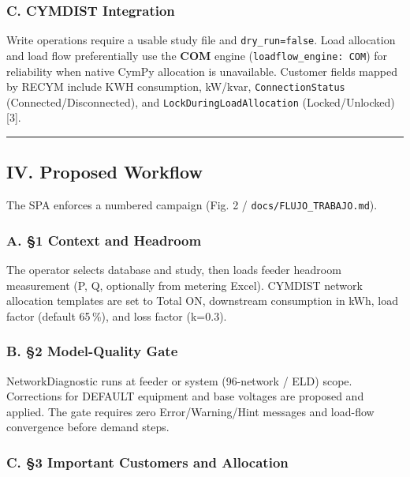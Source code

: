 \documentclass[
  11pt,
]{article}
\begin{document}
\subsubsection{C. CYMDIST Integration}\label{c.-cymdist-integration}

Write operations require a usable study file and
\texttt{dry\_run=false}. Load allocation and load flow preferentially
use the \textbf{COM} engine (\texttt{loadflow\_engine:\ COM}) for
reliability when native CymPy allocation is unavailable. Customer fields
mapped by RECYM include KWH consumption, kW/kvar,
\texttt{ConnectionStatus} (Connected/Disconnected), and
\texttt{LockDuringLoadAllocation} (Locked/Unlocked) {[}3{]}.

\begin{center}\rule{0.5\linewidth}{0.5pt}\end{center}

\subsection{IV. Proposed Workflow}\label{iv.-proposed-workflow}

The SPA enforces a numbered campaign (Fig. 2 /
\texttt{docs/FLUJO\_TRABAJO.md}).

\subsubsection{A. §1 Context and
Headroom}\label{a.-1-context-and-headroom}

The operator selects database and study, then loads feeder headroom
measurement (P, Q, optionally from metering Excel). CYMDIST network
allocation templates are set to Total ON, downstream consumption in kWh,
load factor (default 65\,\%), and loss factor (k=0.3).

\subsubsection{B. §2 Model-Quality Gate}\label{b.-2-model-quality-gate}

NetworkDiagnostic runs at feeder or system (96-network / ELD) scope.
Corrections for DEFAULT equipment and base voltages are proposed and
applied. The gate requires zero Error/Warning/Hint messages and
load-flow convergence before demand steps.

\subsubsection{C. §3 Important Customers and
Allocation}\label{c.-3-important-customers-and-allocation}
\end{document}
